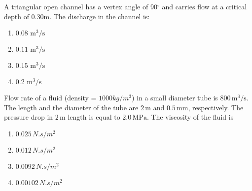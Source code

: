 \iffalse
\chapter{2007}
\author{EE24BTECH11059}
\section{ce}
\fi
    \item{
          	A triangular open channel has a vertex angle of 90$^\circ$ and carries flow at a critical depth of 0.30m. The discharge in the channel is:\ \text{  }\hfill
                
            \begin{multicols}{4}
				\begin{enumerate}
					\item $0.08 \text{ m}^3/\text{s}$ 
					
					\item $0.11 \text{ m}^3/\text{s}$ 
					
					\item $0.15 \text{ m}^3/\text{s}$ 
					
					\item $0.2 \text{ m}^3/\text{s}$
				\end{enumerate}
			\end{multicols}
            }
    \item{
            Flow rate of a fluid (density = $1000 kg/m^3$) in a small diameter tube is $800 \, \text{m}^3/\text{s}$. The length and the diameter of the tube are $2 \, \text{m}$ and $0.5 \, \text{mm}$, respectively. The pressure drop in $2 \, \text{m}$ length is equal to $2.0 \, \text{MPa}$. The viscosity of the fluid is\hfill
                
            \begin{multicols}{4}
                \begin{enumerate}
                    \item $0.025 \, {N.s}/{m^2}$
                    \item $0.012 \, {N.s}/{m^2}$
                    \item $0.0092 \, {N.s}/{m^2}$
                    \item $0.00102 \, {N.s}/{m^2}$
                \end{enumerate}
            \end{multicols}
        }
